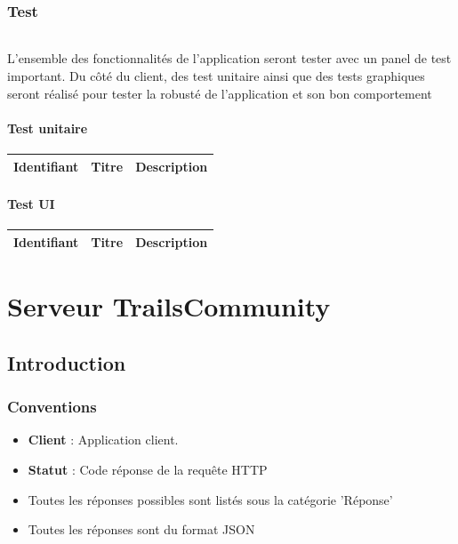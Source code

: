\documentclass[titlepage, 12pt]{report}
\begin{document}

\section{Test}

\paragraph{}L'ensemble des fonctionnalités de l'application seront tester avec un panel de test important. Du côté du client, des test unitaire ainsi que des tests graphiques seront réalisé pour tester la robusté de l'application et son bon comportement

\subsection{Test unitaire}

\begin{center}
	\begin{tabular}{|c|c|c|}
		\hline
		Identifiant & Titre & Description \\
		\hline \hline
	\end{tabular}
\end{center}

\subsection{Test UI}

\begin{center}
	\begin{tabular}{|c|c|c|}
		\hline
		Identifiant & Titre & Description \\
		\hline \hline
	\end{tabular}
\end{center}

\part{Serveur TrailsCommunity}

\chapter{Introduction}

\section{Conventions}
\begin{itemize}
	\item \textbf{Client} : Application client.
	\item \textbf{Statut} : Code réponse de la requête HTTP
	\item Toutes les réponses possibles sont listés sous la catégorie 'Réponse'
	\item Toutes les réponses sont du format JSON
\end{itemize}
\end{document}
